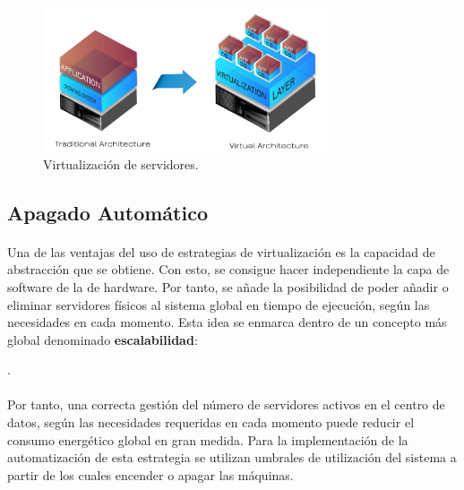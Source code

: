 \documentclass[10pt]{article}
\begin{document}
			\begin{figure}[htpb!]
				\begin{center}
					\includegraphics[width=0.75\textwidth]{virtualization}
					\caption{Virtualización de servidores.\cite{exelos:virtualization}}
					\label{image:virtualization}
				\end{center}
			\end{figure}

		\subsection{Apagado Automático}

			\paragraph{}
			Una de las ventajas del uso de estrategias de virtualización es la capacidad de abstracción que se obtiene. Con esto, se consigue hacer independiente la capa de software de la de hardware. Por tanto, se añade la posibilidad de poder añadir o eliminar servidores físicos al sistema global en tiempo de ejecución, según las necesidades en cada momento. Esta idea se enmarca dentro de un concepto más global denominado \textbf{escalabilidad}:

			\cite{wikipedia:escalabilidad}.

			\paragraph{}
			Por tanto, una correcta gestión del número de servidores activos en el centro de datos, según las necesidades requeridas en cada momento puede reducir el consumo energético global en gran medida. Para la implementación de la automatización de esta estrategia se utilizan umbrales de utilización del sistema a partir de los cuales encender o apagar las máquinas.
\end{document}
